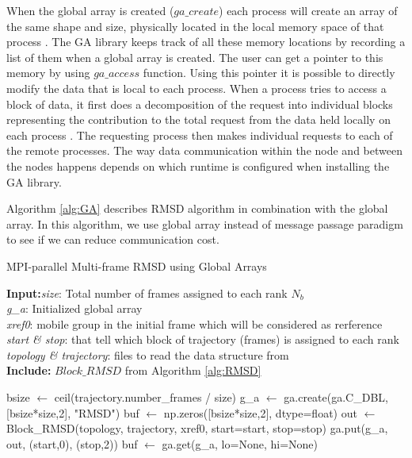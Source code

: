 When the global array is created ($ga\_create$) each process will create an array of the same shape and size, physically located in the local memory space of that process \cite{GA}. 
The GA library keeps track of all these memory locations by recording a list of them when a global array is created. 
The user can get a pointer to this memory by using $ga\_access$ function.
Using this pointer it is possible to directly modify the data that is local to each process.
When a process tries to access a block of data, it first does a decomposition of the request into individual blocks representing the contribution to the total request from the data held locally on each process \cite{PNNL:2018}. 
The requesting process then makes individual requests to each of the remote processes. 
The way data communication within the node and between the nodes happens depends on which runtime is configured when installing the GA library.

Algorithm \ref{alg:GA} describes RMSD algorithm in combination with the global array.
In this algorithm, we use global array instead of message passage paradigm to see if we can reduce communication cost. 

\begin{algorithm}[ht!]
	\scriptsize
	\caption{MPI-parallel Multi-frame RMSD using Global Arrays}
	\label{alg:GA}
	\hspace*{\algorithmicindent} \textbf{Input:}\emph{size}: Total number of frames assigned to each rank $N_{b}$\\
	\hspace*{\algorithmicindent} \emph{g\_a}: Initialized global array \\
	\hspace*{\algorithmicindent} \emph{xref0}: mobile group in the initial frame which will be considered as rerference \\
	\hspace*{\algorithmicindent} \emph{start \& stop}: that tell which block of trajectory (frames) is assigned to each rank \\
	\hspace*{\algorithmicindent} \emph{topology \& trajectory}: files to read the data structure from \\
	\hspace*{\algorithmicindent}\textbf{Include:} $Block\_RMSD$ from Algorithm \ref{alg:RMSD}
	\begin{algorithmic}[1]
		
		\State bsize $\leftarrow$ ceil(trajectory.number\_frames / size)
		\State g\_a $\leftarrow$ ga.create(ga.C\_DBL, [bsize*size,2], "RMSD")
		\State buf $\leftarrow$ np.zeros([bsize*size,2], dtype=float)
		\State out $\leftarrow$ Block\_RMSD(topology, trajectory, xref0, start=start, stop=stop)
		\State ga.put(g\_a, out, (start,0), (stop,2))
		\State buf $\leftarrow$ ga.get(g\_a, lo=None, hi=None)
		\EndIf
	\end{algorithmic}
\end{algorithm}


